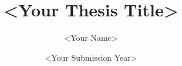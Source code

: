 \documentclass{uumthesis}
\title{<Your Thesis Title>}
\author{<Your Name>}
\date{<Your Submission Year>}
\begin{document}
\frontmatter
\maketitle





\tableofcontents
\listoftables
\listoffigures
\listofappendices




\mainmatter




%



%



\appendix


\end{document}
